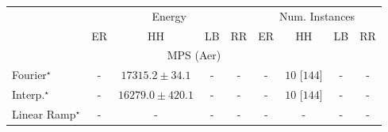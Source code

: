 \begin{tabular}{l|cccc|cccc|}
\toprule
& \multicolumn{4}{c|}{Energy} & \multicolumn{4}{c|}{Num. Instances} \\
            & ER & HH & LB & RR & ER & HH & LB & RR \\
\midrule
\multicolumn{9}{c}{\rule{0pt}{8pt}MPS (Aer)} \\
\midrule
Fourier$^\star$ & {\cellcolor[HTML]{000000}} \color[HTML]{F1F1F1} {\cellcolor{white}} \color{black} - & {\cellcolor[HTML]{4D004B}} \color[HTML]{F1F1F1} $17315.2\pm 34.1$ & {\cellcolor[HTML]{000000}} \color[HTML]{F1F1F1} {\cellcolor{white}} \color{black} - & {\cellcolor[HTML]{000000}} \color[HTML]{F1F1F1} {\cellcolor{white}} \color{black} - & {\cellcolor[HTML]{000000}} \color[HTML]{F1F1F1} {\cellcolor{white}} \color{black} - & {\cellcolor[HTML]{49006A}} \color[HTML]{F1F1F1} $10$ [$144$] & {\cellcolor[HTML]{000000}} \color[HTML]{F1F1F1} {\cellcolor{white}} \color{black} - & {\cellcolor[HTML]{000000}} \color[HTML]{F1F1F1} {\cellcolor{white}} \color{black} - \\
Interp.$^\star$ & {\cellcolor[HTML]{000000}} \color[HTML]{F1F1F1} {\cellcolor{white}} \color{black} - & {\cellcolor[HTML]{F7FCFD}} \color[HTML]{000000} $16279.0\pm 420.1$ & {\cellcolor[HTML]{000000}} \color[HTML]{F1F1F1} {\cellcolor{white}} \color{black} - & {\cellcolor[HTML]{000000}} \color[HTML]{F1F1F1} {\cellcolor{white}} \color{black} - & {\cellcolor[HTML]{000000}} \color[HTML]{F1F1F1} {\cellcolor{white}} \color{black} - & {\cellcolor[HTML]{49006A}} \color[HTML]{F1F1F1} $10$ [$144$] & {\cellcolor[HTML]{000000}} \color[HTML]{F1F1F1} {\cellcolor{white}} \color{black} - & {\cellcolor[HTML]{000000}} \color[HTML]{F1F1F1} {\cellcolor{white}} \color{black} - \\
Linear Ramp$^\star$ & {\cellcolor[HTML]{000000}} \color[HTML]{F1F1F1} {\cellcolor{white}} \color{black} - & {\cellcolor[HTML]{000000}} \color[HTML]{F1F1F1} {\cellcolor{white}} \color{black} - & {\cellcolor[HTML]{000000}} \color[HTML]{F1F1F1} {\cellcolor{white}} \color{black} - & {\cellcolor[HTML]{000000}} \color[HTML]{F1F1F1} {\cellcolor{white}} \color{black} - & {\cellcolor[HTML]{000000}} \color[HTML]{F1F1F1} {\cellcolor{white}} \color{black} - & {\cellcolor[HTML]{000000}} \color[HTML]{F1F1F1} {\cellcolor{white}} \color{black} - & {\cellcolor[HTML]{000000}} \color[HTML]{F1F1F1} {\cellcolor{white}} \color{black} - & {\cellcolor[HTML]{000000}} \color[HTML]{F1F1F1} {\cellcolor{white}} \color{black} - \\

\end{tabular}
